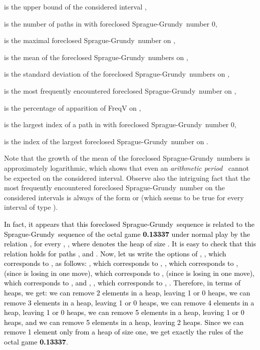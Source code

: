 \documentclass[11pt]{article}
\newcommand{\modif}[1]{\textcolor{black}{#1}}
\newcommand{\SP}{Sprague-Grundy}
\begin{document}
  is the upper bound of the considered interval ,

  is the number of paths in  with foreclosed \SP\ number 0,

  is the maximal foreclosed \SP\ number on ,

  is the mean of the foreclosed \SP\ numbers on ,

  is the standard deviation of the foreclosed \SP\ numbers on ,

  is the most frequently encountered foreclosed \SP\ number on ,

  is the percentage of apparition of FreqV on ,

  is the largest index of a path in  with foreclosed \SP\ number 0,

  is the index of the largest foreclosed \SP\ number on .

\begin{table}

\caption{\label{table:misere}Statistics on the 
mis\`ere foreclosed \SP\ sequence}
\end{table}

Note that the growth of the mean of the foreclosed \SP\ numbers
is approximately logarithmic, which 
shows that even an {\em arithmetic period}~\cite[Chapter~4]{WW}
 cannot be expected on the considered interval.
Observe also the intriguing fact that the most 
frequently encountered foreclosed \SP\ number on the considered intervals
is always of the form  or  (which seems to be true for
every interval of type ).

\modif{
In fact, it appears that this foreclosed \SP\ sequence
is related to the \SP\ sequence of the octal game
{\bf 0.13337} under normal play by the relation
, for every , ,
where  denotes the heap of size .
It is easy to check that this relation holds for paths ,
 and .
Now, let us write the options of , , which corresponds
to ,
as follows:
 , which corresponds to ,
 , which corresponds to ,
  (since  is losing in one move),
which corresponds to ,
  (since  is losing in one move),
which corresponds to ,
and  , ,
which corresponds to , .
Therefore, in terms of heaps, we get:
 we can remove 2 elements in a heap, leaving 1 or 0 heaps,
 we can remove 3 elements in a heap, leaving 1 or 0 heaps,
 we can remove 4 elements in a heap, leaving 1 or 0 heaps,
 we can remove 5 elements in a heap, leaving 1 or 0 heaps,
and  we can remove 5 elements in a heap, leaving 2 heaps.
Since we can remove 1 element only from a heap of size one, we
get exactly the rules of the octal game {\bf 0.13337}.
}
\end{document}
